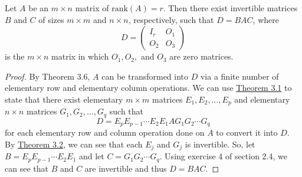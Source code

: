 \begin{corollary}
    Let \( A  \) be an \( m \times n  \) matrix of \( \text{rank}(A) = r \). Then there exist invertible matrices \( B  \) and \( C  \) of sizes \( m \times m  \) and \( n \times n  \), respectively, such that \( D = BAC  \), where 
    \[  D = \begin{pmatrix} 
        {I}_{r} & {O}_{1} \\
        {O}_{2} & {O}_{3}
              \end{pmatrix}  \] is the \( m \times n  \) matrix in which \( {O}_{1}, {O}_{2},  \) and \( {O}_{3}  \) are zero matrices.
          \end{corollary}\label{Corollary 1 to Theorem 3.6}
\begin{proof}
By Theorem 3.6, \( A  \) can be transformed into \( D  \) via a finite number of elementary row and elementary column operations. We can use {\hyperref[Theorem 3.1]{Theorem 3.1}} to state that there exist elementary \( m \times m  \) matrices \( {E}_{1}, {E}_{2}, \dots, {E}_{p} \) and elementary \( n \times n  \) matrices \( {G}_{1}, {G}_{2}, \dots, {G}_{q} \) such that
    \[  D = {E}_{p} {E}_{p-1} \cdots {E}_{2} {E}_{1} A {G}_{1} {G}_{2} \cdots {G}_{q} \]
for each elementary row and column operation done on \( A  \) to convert it into \( D  \). By {\hyperref[Theorem 3.2]{Theorem 3.2}}, we can see that each \( {E}_{j}  \) and \( {G}_{j} \) is invertible. So, let \( B ={E}_{p} {E}_{p-1} \cdots {E}_{2} {E}_{1} \) and let \( C = {G}_{1} {G}_{2} \cdots {G}_{q} \). Using exercise 4 of section 2.4, we can see that \( B  \) and \( C  \) are invertible and thus \( D = BAC \).
\end{proof}

